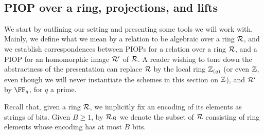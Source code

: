\documentclass[11pt,letterpaper,usenames,dvipsnames]{article}
\begin{document}
\begin{equation*}
\begin{aligned}
	
\end{aligned}	
\end{equation*}

    \subsection{PIOP over a ring, projections, and lifts}

    We start by outlining our setting and presenting some tools we will work with. Mainly, we define what we mean by a relation to be algebraic over a ring $\mathcal{R}$, and we establish correspondences between PIOPs for a relation over a ring $\mathcal{R}$, and a PIOP for an homomorphic image $\mathcal{R}'$ of $\mathcal{R}$. A reader wishing to tone down the abstractness of the presentation can replace $\mathcal{R}$ by the local ring $\mathbb{Z}_{(q)}$ (or even $\mathbb{Z}$, even though we will never instantiate the schemes in this section on $\mathbb{Z}$), and $\mathcal{R}'$ by $\FF_q$, for $q$ a prime.

    
    Recall that, given a ring $\mathcal{R}$, we implicitly fix an encoding of its elements as strings of bits. Given $B\geq 1$, by $\mathcal{R}_B$ we denote the subset of $\mathcal{R}$ consisting of ring elements whose encoding has at most $B$ bits.
\end{document}

